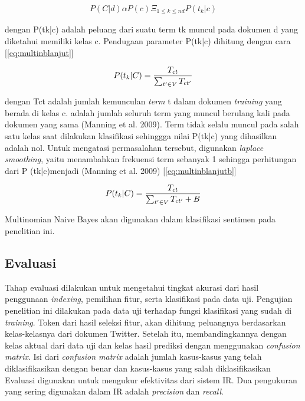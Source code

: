\begin{equation}
\begin{split}
P(C|d) \alpha P(c) \Xi_{1\le k\le nd}P(t_k|c)
\label{eq:multinb}
\end{split}
\end{equation}

dengan P(tk|c) adalah peluang dari suatu term tk muncul pada dokumen d yang diketahui memiliki kelas c. Pendugaan parameter P(tk|c) dihitung dengan cara [\ref{eq:multinblanjut}]

\begin{equation}
\begin{split}
\tiny
P(t_k|C) = \frac{T_{ct}}{\sum _{t' \in V} T_{ct'}}
\label{eq:multinblanjut}
\normalsize
\end{split}
\end{equation}

dengan Tct adalah jumlah kemunculan \textit{term} t dalam dokumen \textit{training} yang berada di kelas c.  adalah jumlah seluruh term yang muncul berulang kali pada dokumen yang sama (Manning et al. 2009).
Term tidak selalu muncul pada salah satu kelas saat dilakukan \newline klasifikasi sehinggga nilai P(tk|c) yang dihasilkan adalah nol. Untuk mengatasi permasalahan tersebut, digunakan \textit{laplace smoothing}, yaitu menambahkan frekuensi term sebanyak 1 sehingga perhitungan dari P (tk|c)menjadi (Manning et al. 2009) [\ref{eq:multinblanjutb}]

\begin{equation}
\begin{split}
\tiny
P(t_k|C) = \frac{T_{ct}}{\sum _{t' \in V} T_{ct'} + B}
\label{eq:multinblanjutb}
\normalsize
\end{split}
\end{equation}

Multinomian Naive Bayes akan digunakan dalam klasifikasi sentimen pada penelitian ini.

\subsection*{Evaluasi}
Tahap evaluasi dilakukan untuk mengetahui tingkat akurasi dari hasil penggunaan \textit{indexing}, pemilihan fitur, serta klasifikasi pada data uji. Pengujian penelitian ini dilakukan pada data uji terhadap fungsi klasifikasi yang sudah di \textit{training}. Token dari hasil seleksi fitur, akan dihitung peluangnya berdasarkan kelas-kelasnya dari dokumen Twitter.
\newline Setelah itu, membandingkannya dengan kelas aktual dari data uji dan kelas hasil prediksi dengan menggunakan \textit{confusion matrix}. Isi dari \textit{confusion matrix} adalah jumlah kasus-kasus yang telah diklasifikasikan dengan benar dan kasus-kasus yang salah diklasifikasikan
\newline Evaluasi digunakan untuk mengukur efektivitas dari sistem IR. Dua pengukuran yang sering digunakan dalam IR adalah \textit{precision} dan \textit{recall}.

